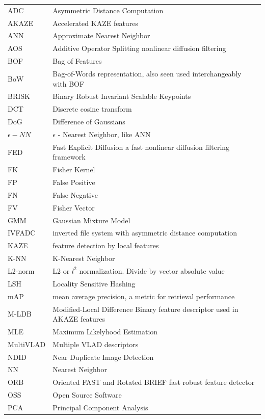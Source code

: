 \documentclass[english,12pt,a4paper,pdftex,elec,utf8]{aaltothesis}
\begin{document}
\begin{tabular}{ll}
  ADC & Asymmetric Distance Computation\\
  AKAZE & Accelerated KAZE features\\
  ANN & Approximate Nearest Neighbor\\
  AOS & Additive Operator Splitting nonlinear diffusion filtering\\
  BOF & Bag of Features\\
  BoW & Bag-of-Words representation, also seen used interchangeably with BOF\\
  BRISK & Binary Robust Invariant Scalable Keypoints\\
  DCT & Discrete cosine transform\\
  DoG & Difference of Gaussians\\
  $\epsilon -NN$ & $\epsilon$ - Nearest Neighbor, like ANN\\
  FED & Fast Explicit Diffusion a fast nonlinear diffusion filtering framework\\
  FK & Fisher Kernel\\
  FP & False Positive\\
  FN & False Negative\\
  FV & Fisher Vector\\
  GMM & Gaussian Mixture Model\\
  IVFADC & inverted file system with asymmetric distance computation\\
  KAZE & feature detection by local features\\
  K-NN & K-Nearest Neighbor\\
  L2-norm & L2 or $l^2$ normalization. Divide by vector absolute value\\
  LSH & Locality Sensitive Hashing\\
  mAP & mean average precision, a metric for retrieval performance\\
  M-LDB & Modified-Local Difference Binary feature descriptor used in AKAZE features\\
  MLE & Maximum Likelyhood Estimation\\
  MultiVLAD & Multiple VLAD descriptors\\
  NDID & Near Duplicate Image Detection\\
  NN & Nearest Neighbor\\
  ORB & Oriented FAST and Rotated BRIEF fast robust feature detector\\
  OSS & Open Source Software\\
  PCA & Principal Component Analysis\\

\end{tabular}
\end{document}
